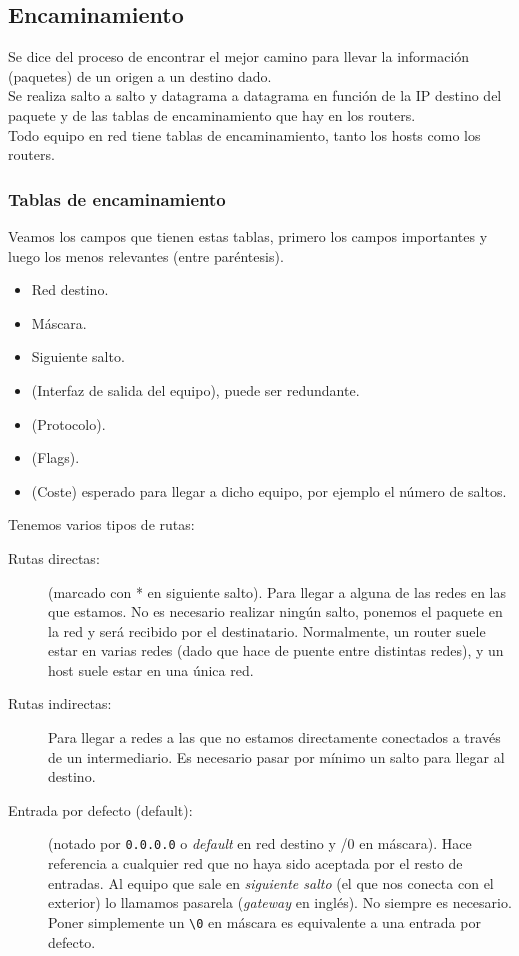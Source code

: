 \subsection{Encaminamiento}
Se dice del proceso de encontrar el mejor camino para llevar la información (paquetes) de un origen a un destino dado. \\

Se realiza salto a salto y datagrama a datagrama en función de la IP destino del paquete y de las tablas de encaminamiento que hay en los routers. \\

Todo equipo en red tiene tablas de encaminamiento, tanto los hosts como los routers.

\subsubsection{Tablas de encaminamiento}
Veamos los campos que tienen estas tablas, primero los campos importantes y luego los menos relevantes (entre paréntesis).
\begin{itemize}
    \item Red destino. 
    \item Máscara.
    \item Siguiente salto. 
    \item (Interfaz de salida del equipo), puede ser redundante. 
    \item (Protocolo).
    \item (Flags).
    \item (Coste) esperado para llegar a dicho equipo, por ejemplo el número de saltos. 
\end{itemize}

Tenemos varios tipos de rutas:
\begin{description}
    \item [Rutas directas:] (marcado con * en siguiente salto). Para llegar a alguna de las redes en las que estamos. No es necesario realizar ningún salto, ponemos el paquete en la red y será recibido por el destinatario. Normalmente, un router suele estar en varias redes (dado que hace de puente entre distintas redes), y un host suele estar en una única red. 
    \item [Rutas indirectas:] Para llegar a redes a las que no estamos directamente conectados a través de un intermediario. Es necesario pasar por mínimo un salto para llegar al destino.  
    \item [Entrada por defecto (default):] (notado por \verb|0.0.0.0| o \textit{default} en red destino y /0 en máscara). Hace referencia a cualquier red que no haya sido aceptada por el resto de entradas. Al equipo que sale en \textit{siguiente salto} (el que nos conecta con el exterior) lo llamamos pasarela (\textit{gateway} en inglés). No siempre es necesario. Poner simplemente un \verb|\0| en máscara es equivalente a una entrada por defecto.
\end{description}

